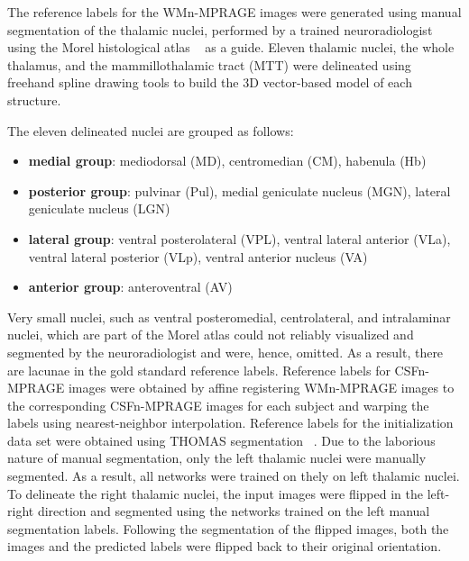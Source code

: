 The reference labels for the WMn-MPRAGE images were generated using manual segmentation of the thalamic nuclei, performed by a trained neuroradiologist using the Morel histological atlas \unskip~\cite{1643371:26789963} as a guide. Eleven thalamic nuclei, the whole thalamus, and the mammillothalamic tract (MTT) were delineated using freehand spline drawing tools to build the 3D vector-based model of each structure. 

The eleven delineated nuclei are grouped as follows:



\begin{itemize}
  \item \relax \textbf{medial group}: mediodorsal (MD), centromedian (CM), habenula (Hb)
  \item \relax \textbf{posterior group}: pulvinar (Pul), medial geniculate nucleus (MGN), lateral geniculate nucleus (LGN)
  \item \relax \textbf{lateral group}: ventral posterolateral (VPL), ventral lateral anterior (VLa), ventral lateral posterior (VLp), ventral anterior nucleus (VA)
  \item \relax \textbf{anterior group}:  anteroventral (AV)
\end{itemize}
  Very small nuclei, such as ventral posteromedial, centrolateral, and intralaminar nuclei, which are part of the Morel atlas could not reliably visualized and segmented by the neuroradiologist and were, hence, omitted. As a result, there are lacunae in the gold standard reference labels. Reference labels for CSFn-MPRAGE images were obtained by affine registering WMn-MPRAGE images to the corresponding CSFn-MPRAGE images for each subject and warping the labels using nearest-neighbor interpolation. Reference labels for the initialization data set were obtained using THOMAS segmentation \unskip~\cite{1643371:26789960}. Due to the laborious nature of manual segmentation, only the left thalamic nuclei were manually segmented. As a result, all networks were trained on thely on left thalamic nuclei. To delineate the right thalamic nuclei, the input images were flipped in the left-right direction and segmented using the networks trained on the left manual segmentation labels. Following the segmentation of the flipped images, both the images and the predicted labels were flipped back to their original orientation.



